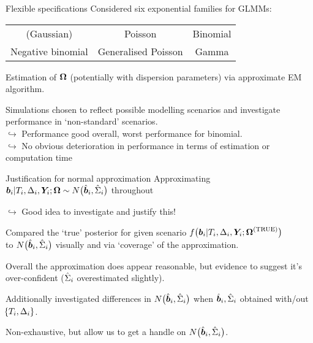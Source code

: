 \documentclass[10pt]{beamer}
\begin{document}
\begin{frame}{Flexible specifications}
    Considered six exponential families for GLMMs:
    \begin{table}[h]
        \centering
        \begin{tabular}{ccc}
            (Gaussian) & Poisson & Binomial \\
            Negative binomial & Generalised Poisson & Gamma
        \end{tabular}
    \end{table}
    \vspace{3.75mm}
    Estimation of $\bm{\mathrm{\Omega}}$ (potentially with dispersion parameters) via approximate EM algorithm.\\

    \vspace{5mm}

    Simulations chosen to reflect possible modelling scenarios and investigate performance in `non-standard' scenarios.\\
    \vspace{1mm}
    $\hookrightarrow$ 
    Performance good overall, worst performance for binomial.\\
    \vspace{1mm}
    $\hookrightarrow$
    No obvious deterioration in performance in terms of estimation or computation time
    
\end{frame}

\begin{frame}{Justification for normal approximation}
    Approximating $\bm{b}_i|T_i,\Delta_i,\bm{Y}_i;\bm{\mathrm{\Omega}}\sim N\big(\hat{\bm{b}}_i,\hat{\Sigma}_i\big)$ throughout\\
    
    \vspace{1mm}
    
    $\hookrightarrow$ Good idea to investigate and justify this!\\
    
    \vspace{5mm}
    
    Compared the `true' posterior for given scenario $f\big(\bm{b}_i|T_i,\Delta_i,\bm{Y}_i;\bm{\mathrm{\Omega}}^{(\mathrm{TRUE})}\big)$\\to $N\big(\hat{\bm{b}}_i,\hat{\Sigma}_i\big)$ visually and via `coverage' of the approximation.\\

    \vspace{5mm}

    Overall the approximation does appear reasonable, but evidence to suggest it's over-confident (\ie $\hat{\Sigma}_i$ overestimated slightly).\\

    \vspace{5mm}

    Additionally investigated differences in $N\big(\hat{\bm{b}}_i,\hat{\Sigma}_i\big)$ when $\hat{\bm{b}}_i, \hat{\Sigma}_i$ obtained with/out $\!\left\{ T_i, \Delta_i\right\}$.\\

    \vspace{5mm}

    Non-exhaustive, but allow us to get a handle on $N\big(\hat{\bm{b}}_i,\hat{\Sigma}_i\big)$.
    
\end{frame}
\end{document}
